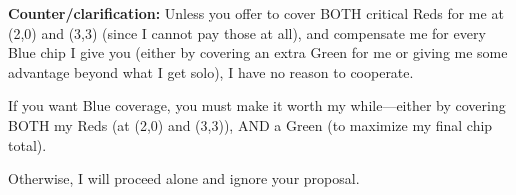 \documentclass{article} %
\begin{document}
\begin{bluebox}[P-Blue]
\vspace{0.5em}

\textbf{Counter/clarification:}  
Unless you offer to cover BOTH critical Reds for me at (2,0) and (3,3) (since I cannot pay those at all), and compensate me for every Blue chip I give you (either by covering an extra Green for me or giving me some advantage beyond what I get solo), I have no reason to cooperate.

\vspace{0.5em}

If you want Blue coverage, you must make it worth my while—either by covering BOTH my Reds (at (2,0) and (3,3)), AND a Green (to maximize my final chip total).

\vspace{0.5em}

Otherwise, I will proceed alone and ignore your proposal.
\end{bluebox}
\end{document}
